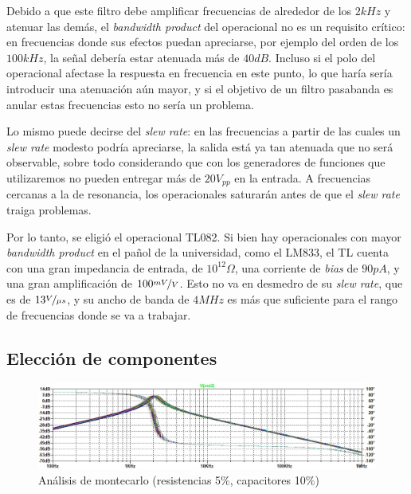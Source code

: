 \documentclass[../../tc_tp3_main.tex]{subfiles}
\begin{document}
Debido a que este filtro debe amplificar frecuencias de alrededor de los $2kHz$ y atenuar las dem\'as, el \textit{bandwidth product} del operacional no es un requisito cr\'itico: en frecuencias donde sus efectos puedan apreciarse, por ejemplo del orden de los $100kHz$, la se\~nal deber\'ia estar atenuada m\'as de $40dB$. Incluso si el polo del operacional afectase la respuesta en frecuencia en este punto, lo que har\'ia ser\'ia introducir una atenuaci\'on a\'un mayor, y si el objetivo de un filtro pasabanda es anular estas frecuencias esto no ser\'ia un problema. \par 

Lo mismo puede decirse del \textit{slew rate}: en las frecuencias a partir de las cuales un \textit{slew rate} modesto podr\'ia apreciarse, la salida est\'a ya tan atenuada que no ser\'a observable, sobre todo considerando que con los generadores de funciones que utilizaremos no pueden entregar m\'as de $20V_{pp}$ en la entrada. A frecuencias cercanas a la de resonancia, los operacionales saturar\'an antes de que el \textit{slew rate} traiga problemas.\par

Por lo tanto, se eligi\'o el operacional TL082. Si bien hay operacionales con mayor \textit{bandwidth product} en el pa\~nol de la universidad, como el LM833, el TL cuenta con una gran impedancia de entrada, de $10^{12}\Omega$, una corriente de \textit{bias} de $90pA$, y una gran amplificaci\'on de $100\nicefrac{mV}{V}$. Esto no va en desmedro de su \textit{slew rate}, que es de $13\nicefrac{V}{\mu s}$, y su ancho de banda de $4MHz$ es m\'as que suficiente para el rango de frecuencias donde se va a trabajar.


\subsection{Elecci\'on de componentes}

\begin{figure}[t]
	\centering
  \includegraphics[scale = 0.7]{imagenes/ej1-montecarlo.jpg}
  \caption{An\'alisis de montecarlo (resistencias 5\%, capacitores 10\%)}
  \label{fig:1-montecarlo}
\end{figure}
\end{document}

